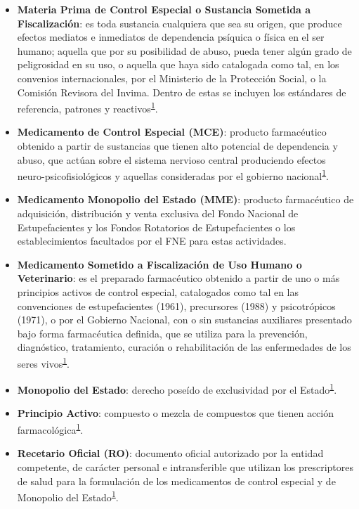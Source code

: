 \documentclass[
  oneside]{book}
\begin{document}
\begin{itemize}
\item
  \textbf{Materia Prima de Control Especial o Sustancia Sometida a Fiscalización}: es toda sustancia cualquiera que sea su origen, que produce efectos mediatos e inmediatos de dependencia psíquica o física en el ser humano; aquella que por su posibilidad de abuso, pueda tener algún grado de peligrosidad en su uso, o aquella que haya sido catalogada como tal, en los convenios internacionales, por el Ministerio de la Protección Social, o la Comisión Revisora del Invima. Dentro de estas se incluyen los estándares de referencia, patrones y reactivos\textsuperscript{\protect\hyperlink{ref-MSPS1478-2006}{1}}.
\item
  \textbf{Medicamento de Control Especial (MCE)}: producto farmacéutico obtenido a partir de sustancias que tienen alto potencial de dependencia y abuso, que actúan sobre el sistema nervioso central produciendo efectos neuro-psicofisiológicos y aquellas consideradas por el gobierno nacional\textsuperscript{\protect\hyperlink{ref-MSPS1478-2006}{1}}.
\item
  \textbf{Medicamento Monopolio del Estado (MME)}: producto farmacéutico de adquisición, distribución y venta exclusiva del Fondo Nacional de Estupefacientes y los Fondos Rotatorios de Estupefacientes o los establecimientos facultados por el FNE para estas actividades.
\item
  \textbf{Medicamento Sometido a Fiscalización de Uso Humano o Veterinario}: es el preparado farmacéutico obtenido a partir de uno o más principios activos de control especial, catalogados como tal en las convenciones de estupefacientes (1961), precursores (1988) y psicotrópicos (1971), o por el Gobierno Nacional, con o sin sustancias auxiliares presentado bajo forma farmacéutica definida, que se utiliza para la prevención, diagnóstico, tratamiento, curación o rehabilitación de las enfermedades de los seres vivos\textsuperscript{\protect\hyperlink{ref-MSPS1478-2006}{1}}.
\item
  \textbf{Monopolio del Estado}: derecho poseído de exclusividad por el Estado\textsuperscript{\protect\hyperlink{ref-MSPS1478-2006}{1}}.
\item
  \textbf{Principio Activo}: compuesto o mezcla de compuestos que tienen acción farmacológica\textsuperscript{\protect\hyperlink{ref-MSPS1478-2006}{1}}.
\item
  \textbf{Recetario Oficial (RO)}: documento oficial autorizado por la entidad competente, de carácter personal e intransferible que utilizan los prescriptores de salud para la formulación de los medicamentos de control especial y de Monopolio del Estado\textsuperscript{\protect\hyperlink{ref-MSPS1478-2006}{1}}.

\end{itemize}
\end{document}
